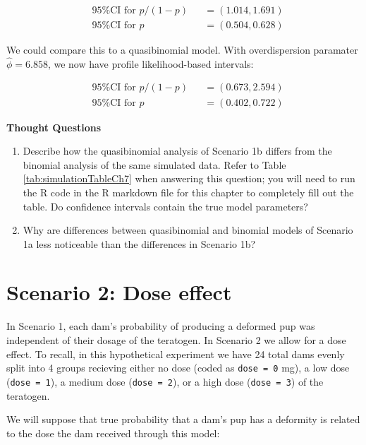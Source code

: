 \documentclass[
]{krantz}
\begin{document}
\[
\begin{alignedat}{2}
  &\textrm{95\% CI for } p/(1-p) &&= (1.014, 1.691) \\
  &\textrm{95\% CI for } p       &&= (0.504, 0.628)
\end{alignedat}
\]

We could compare this to a quasibinomial model. With overdispersion paramater \(\widehat{\phi} = 6.858\), we now have profile likelihood-based intervals:

\[
\begin{alignedat}{2}
  &\textrm{95\% CI for } p/(1-p) &&= (0.673, 2.594) \\
  &\textrm{95\% CI for } p       &&= (0.402, 0.722)
\end{alignedat}
\]

\vspace{5mm}

\textbf{Thought Questions}

\begin{enumerate}
\def\labelenumi{\arabic{enumi}.}
\setcounter{enumi}{3}
\item
  Describe how the quasibinomial analysis of Scenario 1b differs from the binomial analysis of the same simulated data. Refer to Table \ref{tab:simulationTableCh7} when answering this question; you will need to run the R code in the R markdown file for this chapter to completely fill out the table. Do confidence intervals contain the true model parameters?
\item
  Why are differences between quasibinomial and binomial models of Scenario 1a less noticeable than the differences in Scenario 1b?
\end{enumerate}

\hypertarget{scenario-2-dose-effect}{%
\section{Scenario 2: Dose effect}\label{scenario-2-dose-effect}}

In Scenario 1, each dam's probability of producing a deformed pup was independent of their dosage of the teratogen. In Scenario 2 we allow for a dose effect. To recall, in this hypothetical experiment we have 24 total dams evenly split into 4 groups recieving either no dose (coded as \texttt{dose\ =\ 0} mg), a low dose (\texttt{dose\ =\ 1}), a medium dose (\texttt{dose\ =\ 2}), or a high dose (\texttt{dose\ =\ 3}) of the teratogen.

We will suppose that true probability that a dam's pup has a deformity is related to the dose the dam received through this model:
\end{document}
